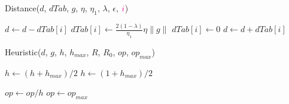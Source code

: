 

\begin{algorithm}[h!]
  \caption{Distance($d$, $dTab$, $g$, $\eta$, $\eta_1$, $\lambda$, $\epsilon$, $\textcolor{magenta}{i}$)}
	\label{algo_dist}
	\begin{algorithmic}
		\STATE $d \leftarrow d-dTab[i]$
		\STATE $dTab[i] \leftarrow \frac{2(1-\lambda)}{\eta_1}\eta \|g\|$
		\ELSE
		\STATE $dTab[i] \leftarrow 0$
		\ENDIF
		\STATE $d \leftarrow d+dTab[i]$
	\end{algorithmic}
\end{algorithm}

\begin{algorithm}[h!]
	\caption{Heuristic($d$, $g$, $h$, $h_{max}$, $R$, $R_0$, $op$, $op_{max}$)}
	\label{algo_heuris}
	\begin{algorithmic}
		\IF{$d<\|g\|$}
		\STATE $h \leftarrow (h+h_{max})/2$	
		\ELSE
		\STATE $h \leftarrow (1+h_{max})/2$	
		\ENDIF
		
		\IF{$R<R_0$}
		\STATE $op \leftarrow op/h$	
		\ELSE
		\STATE $op \leftarrow op_{max}$	
		\ENDIF
	\end{algorithmic}
\end{algorithm}



